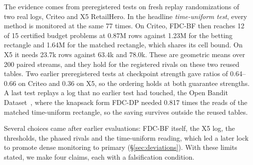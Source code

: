 \documentclass[sigconf,anonymous,review]{acmart}
\begin{document}
The evidence comes from preregistered tests on fresh replay randomizations of two real logs, Criteo and X5 RetailHero. In the headline \emph{time-uniform test}, every method is monitored at the same 77 times. On Criteo, FDC-BF then reaches 12 of 15 certified budget problems at 0.87M rows against 1.23M for the betting rectangle and 1.64M for the matched rectangle, which shares its cell bound. On X5 it needs 23.7k rows against 63.4k and 78.0k. These are geometric means over 200 paired streams, and they hold for the registered rivals on these two reused tables. Two earlier preregistered tests at checkpoint strength gave ratios of 0.64--0.66 on Criteo and 0.36 on X5, so the ordering holds at both guarantee strengths. A last test replays a log that no earlier test had touched, the Open Bandit Dataset~\citep{saito2021open}, where the knapsack form FDC-DP needed 0.817 times the reads of the matched time-uniform rectangle, so the saving survives outside the reused tables.

Several choices came after earlier evaluations: FDC-BF itself, the X5 log, the thresholds, the phased rivals and the time-uniform reading, which led a later lock to promote dense monitoring to primary (\S\ref{sec:deviations}). With these limits stated, we make four claims, each with a falsification condition.
\end{document}
